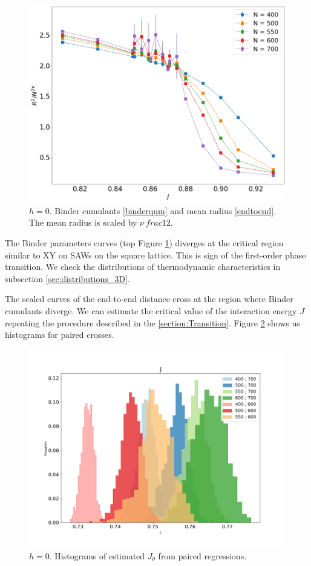 \begin{figure}
	\includegraphics[scale=0.23]{Images/3_rscaling_longchains.png} 	
	
	\caption{$h=0$. Binder  cumulants \eqref{binderqum} and mean radius \eqref{endtoend}. The mean radius is scaled by $\nu \ frac{1}{2}$.  }
	\label{fig:bcshort_3D}
\end{figure}

The Binder parameters curves (top Figure \ref{fig:bcshort_3D}) diverges at the critical region similar to XY on SAWs on the square lattice. This is sign of the first-order phase transition. We check the distributions of thermodynamic characteristics in subsection \ref{sec:distributions_3D}. 

The scaled curves of the end-to-end distance cross at the region where Binder cumulants diverge. We can estimate the critical value of the interaction energy $J$ repeating the procedure described in the \ref{section:Transition}. Figure \ref{fig:Jthetahistogram_3D} shows us histograms for paired crosses. 

 \begin{figure}
	\centering
	\includegraphics[scale=0.28]{Images/radius_hist_cov_3D.png}
	\caption{$h=0$. Histograms of estimated $J_{\theta}$ from paired regressions.  }
	\label{fig:Jthetahistogram_3D}
\end{figure}

